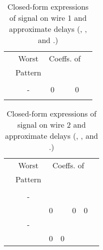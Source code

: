 \documentclass[10pt,journal]{IEEEtran}
\begin{document}
\begin{table}[!t]
\caption{Closed-form expressions of signal on wire 1 and approximate delays (, , and .)}\label{tab:wire1}
\begin{center}
\begin{tabular}{|c|c|c|c|c|c|}
\hline
\multirow{2}{*}{} & Worst & \multicolumn{3}{|c|}{Coeffs. of } & \multirow{2}{*}{}\\
\cline{3-5}
& Pattern &  &  &  & \\
\hline
 &  &  &  &  &  \\
\hline
 & - & 0 &  & 0 & \\
\hline
 &  &  &  &  &  \\
\hline
\end{tabular}
\end{center}
\end{table}

\begin{table}[!t]
\caption{Closed-form expressions of signal on wire 2 and approximate delays (, , and .)}\label{tab:wire2}
\begin{center}
\begin{tabular}{|c|c|p{3mm}|p{3mm}|c|c|c|}
\hline
\multirow{2}{*}{} & Worst & \multicolumn{4}{|c|}{Coeffs. of } & \multirow{2}{*}{}\\
\cline{3-6}
& Pattern &  &  &  &  & \\
\hline
 &  &  &  &  &  &  \\
\hline
 & - &  &  &  &  & \\
\hline
 &  & 0 &  & 0 & 0 &  \\
\hline
 & - &  &  &  &  & \\
\hline
\multirow{2}{*}{} & \multirow{2}{*}{} & \multirow{2}{*}{0} & \multirow{2}{*}{0} & \multirow{2}{*}{} & \multirow{2}{*}{} &  \\
& & & & & & \\
\hline
\end{tabular}
\end{center}
\end{table}
\end{document}
